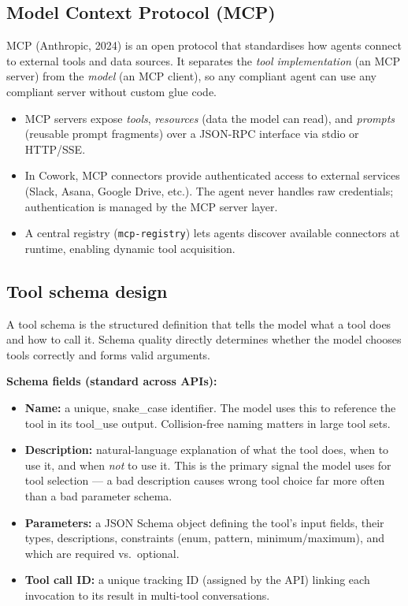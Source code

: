 \subsection{Model Context Protocol (MCP)}

MCP (Anthropic, 2024) is an open protocol that standardises how agents connect to
external tools and data sources. It separates the \emph{tool implementation} (an MCP
server) from the \emph{model} (an MCP client), so any compliant agent can use any
compliant server without custom glue code.

\begin{itemize}
  \item MCP servers expose \emph{tools}, \emph{resources} (data the model can read),
    and \emph{prompts} (reusable prompt fragments) over a JSON-RPC interface via
    stdio or HTTP/SSE.
  \item In Cowork, MCP connectors provide authenticated access to external services
    (Slack, Asana, Google Drive, etc.). The agent never handles raw credentials;
    authentication is managed by the MCP server layer.
  \item A central registry (\texttt{mcp-registry}) lets agents discover available
    connectors at runtime, enabling dynamic tool acquisition.
\end{itemize}

\subsection{Tool schema design}

A tool schema is the structured definition that tells the model what a tool does and
how to call it. Schema quality directly determines whether the model chooses tools
correctly and forms valid arguments.

\textbf{Schema fields (standard across APIs):}
\begin{itemize}
  \item \textbf{Name:} a unique, snake\_case identifier. The model uses this to
    reference the tool in its tool\_use output. Collision-free naming matters in
    large tool sets.
  \item \textbf{Description:} natural-language explanation of what the tool does,
    when to use it, and when \emph{not} to use it. This is the primary signal the
    model uses for tool selection --- a bad description causes wrong tool choice far
    more often than a bad parameter schema.
  \item \textbf{Parameters:} a JSON Schema object defining the tool's input fields,
    their types, descriptions, constraints (enum, pattern, minimum/maximum), and which
    are required vs.\ optional.
  \item \textbf{Tool call ID:} a unique tracking ID (assigned by the API) linking each
    invocation to its result in multi-tool conversations.
\end{itemize}

